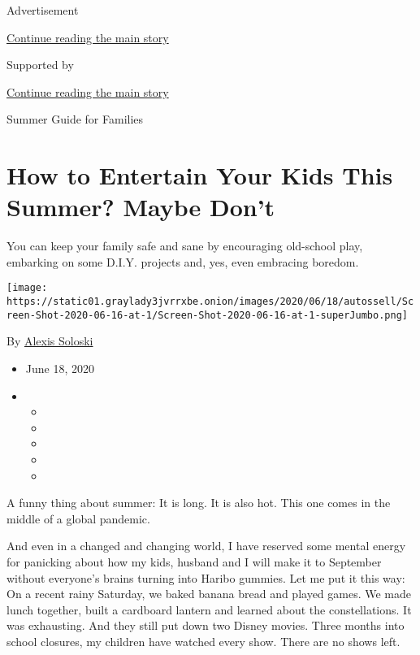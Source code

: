 Advertisement

\protect\hyperlink{after-top}{Continue reading the main story}

Supported by

\protect\hyperlink{after-sponsor}{Continue reading the main story}

Summer Guide for Families

\hypertarget{how-to-entertain-your-kids-this-summer-maybe-dont}{%
\section{How to Entertain Your Kids This Summer? Maybe
Don't}\label{how-to-entertain-your-kids-this-summer-maybe-dont}}

You can keep your family safe and sane by encouraging old-school play,
embarking on some D.I.Y. projects and, yes, even embracing boredom.

\texttt{[image: https://static01.graylady3jvrrxbe.onion/images/2020/06/18/autossell/Screen-Shot-2020-06-16-at-1/Screen-Shot-2020-06-16-at-1-superJumbo.png]}

By \href{https://www.nytimes3xbfgragh.onion/by/alexis-soloski}{Alexis
Soloski}

\begin{itemize}
\item
  June 18, 2020
\item
  \begin{itemize}
  \item
  \item
  \item
  \item
  \item
  \end{itemize}
\end{itemize}

A funny thing about summer: It is long. It is also hot. This one comes
in the middle of a global pandemic.

And even in a changed and changing world, I have reserved some mental
energy for panicking about how my kids, husband and I will make it to
September without everyone's brains turning into Haribo gummies. Let me
put it this way: On a recent rainy Saturday, we baked banana bread and
played games. We made lunch together, built a cardboard lantern and
learned about the constellations. It was exhausting. And they still put
down two Disney movies. Three months into school closures, my children
have watched every show. There are no shows left.

